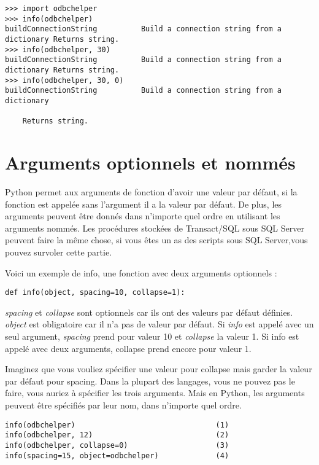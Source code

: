 \begin{example}
\begin{lstlisting}
>>> import odbchelper
>>> info(odbchelper)
buildConnectionString          Build a connection string from a dictionary Returns string.
>>> info(odbchelper, 30)
buildConnectionString          Build a connection string from a dictionary Returns string.
>>> info(odbchelper, 30, 0)
buildConnectionString          Build a connection string from a dictionary

    Returns string.
\end{lstlisting}
\end{example}

\section{Arguments optionnels et nommés}

Python permet aux arguments de fonction d’avoir une valeur par défaut, si la fonction est appelée sans l’argument il a la valeur par défaut. De plus, les arguments peuvent être donnés dans n’importe quel ordre en utilisant les arguments nommés. Les procédures stockées de Transact/SQL sous SQL Server peuvent faire la  même chose, si vous êtes un as des scripts sous SQL Server,vous pouvez survoler cette partie.

\medskip
Voici un exemple de info, une fonction avec deux arguments optionnels :
\begin{lstlisting}
def info(object, spacing=10, collapse=1):
\end{lstlisting}

\emph{spacing} et \emph{collapse} sont optionnels car ils ont des valeurs par défaut définies. \emph{object} est obligatoire car il n’a pas de valeur par défaut. Si \emph{info} est appelé avec un seul argument, \emph{spacing} prend pour valeur 10 et \emph{collapse} la valeur 1. Si info est appelé avec deux arguments, collapse prend encore pour valeur 1.

Imaginez que vous vouliez spécifier une valeur pour collapse mais garder la valeur par défaut pour spacing. Dans la plupart des langages, vous ne pouvez pas le faire, vous auriez à spécifier les trois arguments. Mais en Python, les arguments peuvent être spécifiés par leur nom, dans n’importe quel ordre. 

\begin{example}
\begin{lstlisting}
info(odbchelper)                                (1)
info(odbchelper, 12)                            (2)
info(odbchelper, collapse=0)                    (3)
info(spacing=15, object=odbchelper)             (4)
\end{lstlisting}
\end{example}

